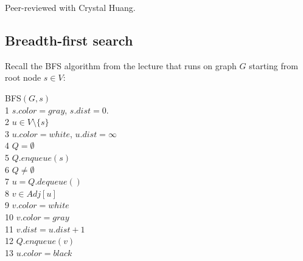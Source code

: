 \def\lc{\left\lceil}   
\def\rc{\right\rceil}
\runningheadrule
\firstpageheadrule
\cfoot{}

\vspace*{-1em}
Peer-reviewed with Crystal Huang.

\subsection{Breadth-first search}
Recall the {\sc BFS} algorithm from the lecture that runs on graph $G$ starting from root node $s \in V$:
\begin{code}
    {\sc BFS}$(G,s)$\\
    1 \> $s.color = gray$, $s.dist = 0$. \\
    2 \> \For $u \in V \setminus \{s\}$ \\
    3 \> \> $u.color = white$, $u.dist = \infty$ \\
    4 \> $Q = \emptyset$ \\
    5 \> $Q.enqueue(s)$ \\
    6 \> \While $Q \neq \emptyset$ \\
    7 \> \> $u = Q.dequeue()$ \\
    8 \> \> \For $v \in Adj[u]$ \\
    9 \> \> \> \If $v.color = white$ \\
    10 \> \> \> \> $v.color = gray$ \\
    11 \> \> \> \> $v.dist = u.dist+1$ \\
    12 \> \> \> \> $Q.enqueue(v)$ \\
    13 \> \> $u.color = black$
\end{code}


